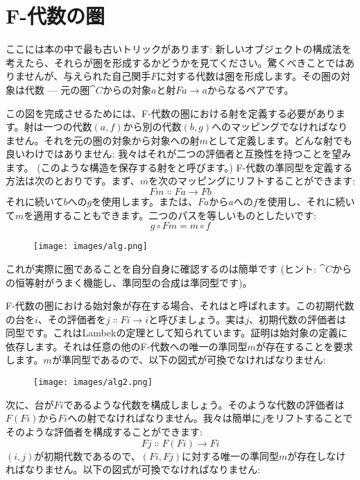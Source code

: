 \section{F-代数の圏}

ここには本の中で最も古いトリックがあります: 新しいオブジェクトの構成法を考えたら、それらが圏を形成するかどうかを見てください。驚くべきことではありませんが、与えられた自己関手$F$に対する代数は圏を形成します。その圏の対象は代数 --- 元の圏$\cat{C}$からの対象$a$と射$F a \to a$からなるペアです。

この図を完成させるためには、F-代数の圏における射を定義する必要があります。射は一つの代数$(a, f)$から別の代数$(b, g)$へのマッピングでなければなりません。それを元の圏の対象から対象への射$m$として定義します。どんな射でも良いわけではありません: 我々はそれが二つの評価者と互換性を持つことを望みます。 (このような構造を保存する射をと呼びます。) F-代数の準同型を定義する方法は次のとおりです。まず、$m$を次のマッピングにリフトすることができます: 
\[F m \Colon F a \to F b\]
それに続いて$b$への$g$を使用します。または、$F a$から$a$への$f$を使用し、それに続いて$m$を適用することもできます。二つのパスを等しいものとしたいです: 
\[g \circ F m = m \circ f\]

\begin{figure}[H]
  \centering
  \texttt{[image: images/alg.png]}
\end{figure}

\noindent
これが実際に圏であることを自分自身に確認するのは簡単です (ヒント: $\cat{C}$からの恒等射がうまく機能し、準同型の合成は準同型です)。

F-代数の圏における始対象が存在する場合、それはと呼ばれます。この初期代数の台を$i$、その評価者を$j \Colon F i \to i$と呼びましょう。実は$j$、初期代数の評価者は同型です。これはLambekの定理として知られています。証明は始対象の定義に依存します。それは任意の他のF-代数への唯一の準同型$m$が存在することを要求します。$m$が準同型であるので、以下の図式が可換でなければなりません: 

\begin{figure}[H]
  \centering
  \texttt{[image: images/alg2.png]}
\end{figure}

\noindent
次に、台が$F i$であるような代数を構成しましょう。そのような代数の評価者は$F (F i)$から$F i$への射でなければなりません。我々は簡単に$j$をリフトすることでそのような評価者を構成することができます: 
\[F j \Colon F (F i) \to F i\]
$(i, j)$が初期代数であるので、$(F i, F j)$に対する唯一の準同型$m$が存在しなければなりません。以下の図式が可換でなければなりません: 

